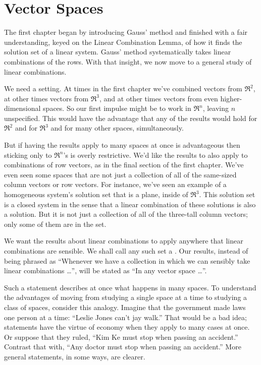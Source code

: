 \chapter{Vector Spaces}
The first chapter began by introducing Gauss' method and finished with a fair
understanding, keyed on the Linear Combination Lemma, 
of how it finds the solution set of a linear system.
Gauss' method systematically takes linear combinations of the rows.
With that insight, we now move to a general study of linear 
combinations.

We need a setting.
At times in the first chapter we've combined vectors from $\Re^2$, 
at other times vectors from $\Re^3$,
and at other times vectors from even higher-dimensional spaces. 
So our first impulse might be 
to work in $\Re^n$, leaving $n$ unspecified.
This would have the advantage that any of the results 
would hold for $\Re^2$ and for $\Re^3$ and for many other spaces,
simultaneously.

But if having the results apply to many spaces at once is
advantageous then sticking only to $\Re^n$'s is overly restrictive. 
We'd like the results to also apply to combinations of row vectors,
as in the final section of the first chapter.
We've even seen some spaces that are not just a collection of all of the
same-sized column vectors or row vectors.
For instance, we've seen an example of a homogeneous system's solution
set that is a plane, inside of $\Re^3$.
This solution set is a closed system in the sense that 
a linear combination of these solutions is also a solution. 
But it is not just a collection of all of the three-tall column vectors; 
only some of them are in the set.

We want the results about linear combinations to apply anywhere that linear
combinations are sensible. 
We shall call any such set a .
Our results, instead of being phrased as
``Whenever we have a collection in which we can sensibly take linear 
combinations \ldots'', will be stated as
``In any vector space \ldots''.

Such a statement describes at once what
happens in many spaces.
To understand the advantages of moving from studying a single space at a time 
to studying a class of spaces, consider this analogy.
Imagine that the government made laws one person at a time:
``Leslie Jones can't jay walk.''
That would be a bad idea; 
statements have the virtue of economy when they apply to many cases at once.
Or suppose that they ruled, ``Kim Ke must stop when passing 
an accident.''
Contrast that with, ``Any doctor must stop when passing 
an accident.''
More general statements, in some ways, are clearer.













